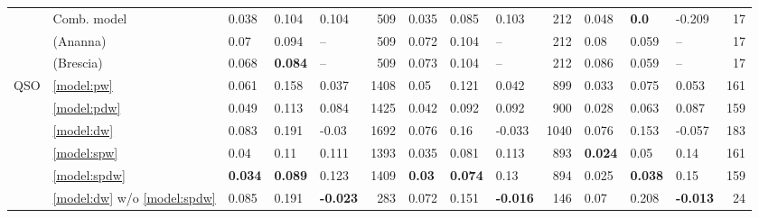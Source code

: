 \documentclass[fleqn,usenatbib]{mnras}
\begin{document}
\begin{table}
\begin{tabular}{lllllrlllrlllr}
                & Comb. model &              0.038 &           0.104 &            0.104 &         509 &              0.035 &           0.085 &            0.103 &         212 &              0.048 &    \textbf{0.0} &           -0.209 &          17 \\
                & (Ananna) &               0.07 &           0.094 &           -- &         509 &              0.072 &           0.104 &           -- &         212 &               0.08 &           0.059 &            -- &          17 \\
                & (Brescia) &              0.068 &  \textbf{0.084} &           -- &         509 &              0.073 &           0.104 &           -- &         212 &              0.086 &           0.059 &           -- &          17 \\
            QSO & \ref{model:pw} &              0.061 &           0.158 &            0.037 &        1408 &               0.05 &           0.121 &            0.042 &         899 &              0.033 &           0.075 &            0.053 &         161 \\
                & \ref{model:pdw} &              0.049 &           0.113 &            0.084 &        1425 &              0.042 &           0.092 &            0.092 &         900 &              0.028 &           0.063 &            0.087 &         159 \\
                & \ref{model:dw} &              0.083 &           0.191 &            -0.03 &        1692 &              0.076 &            0.16 &           -0.033 &        1040 &              0.076 &           0.153 &           -0.057 &         183 \\
                & \ref{model:spw} &               0.04 &            0.11 &            0.111 &        1393 &              0.035 &           0.081 &            0.113 &         893 &     \textbf{0.024} &            0.05 &             0.14 &         161 \\
                & \ref{model:spdw} &     \textbf{0.034} &  \textbf{0.089} &            0.123 &        1409 &      \textbf{0.03} &  \textbf{0.074} &             0.13 &         894 &              0.025 &  \textbf{0.038} &             0.15 &         159 \\
                & \ref{model:dw} w/o \ref{model:spdw} &              0.085 &           0.191 &  \textbf{-0.023} &         283 &              0.072 &           0.151 &  \textbf{-0.016} &         146 &               0.07 &           0.208 &  \textbf{-0.013} &          24 \\

\end{tabular}
\end{table}
\end{document}
